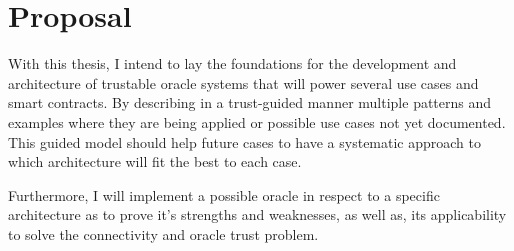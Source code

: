 \section{Proposal}
 
With this thesis, I intend to lay the foundations for the development and architecture of trustable oracle systems that will power several use cases and smart contracts. By describing in a trust-guided manner multiple patterns and examples where they are being applied or possible use cases not yet documented. This guided model should help future cases to have a systematic approach to which architecture will fit the best to each case.  

Furthermore, I will implement a possible oracle in respect to a specific architecture as to prove it's strengths and weaknesses, as well as, its applicability to solve the connectivity and oracle trust problem.
